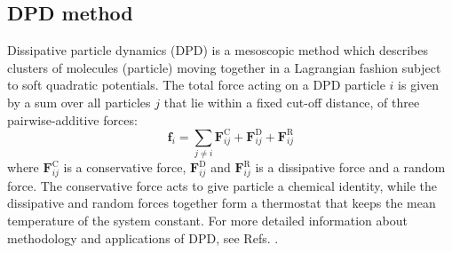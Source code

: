 \documentclass[%
 reprint,
 amsmath,amssymb,
 aps,
]{revtex4-1}
\begin{document}
\subsection{DPD method}
Dissipative particle dynamics (DPD) \cite{hoogerbrugge_simulating_1992} is a mesoscopic method which describes clusters of molecules (particle) moving together in a Lagrangian fashion subject to soft quadratic potentials. The total force acting on a DPD particle $i$ is given by a sum over all particles $j$ that lie within a fixed cut-off distance, of three pairwise-additive forces:
\begin{equation}\label{Forcesum}
\mathbf{f}_{i}  = \sum_{j\neq i} \mathbf{F}_{ij}^\mathrm{C} + \mathbf{F}_{ij}^\mathrm{D} + \mathbf{F}_{ij}^\mathrm{R}
\end{equation}
where $\mathbf{F}_{ij}^\mathrm{C}$ is a conservative force, $\mathbf{F}_{ij}^\mathrm{D}$ and $\mathbf{F}_{ij}^\mathrm{R}$ is a dissipative force and a random force. The conservative force acts to give particle a chemical identity, while the dissipative and random forces together form a thermostat that keeps the mean temperature of the system constant. For more detailed information about methodology and applications of DPD, see Refs. \cite{hoogerbrugge_simulating_1992,liu_dissipative_2014}.

\end{document}
